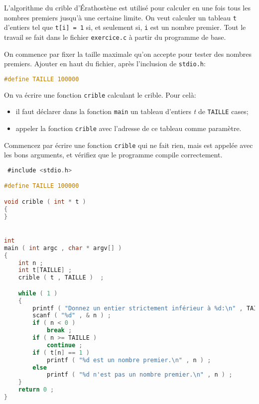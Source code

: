 \titre{\ttableaux}




\prerequis {}

L'algorithme du crible d'Érathostène est utilisé pour calculer en une
fois tous les nombres premiers jusqu'à une certaine limite. On veut
calculer un tableau \texttt{t} d'entiers tel que \texttt{t[i] = 1} si,
et seulement si, \texttt{i} est un nombre premier. Tout le travail se
fait dans le fichier \texttt{exercice.c} à partir
du programme de base.

\question On commence par fixer la taille maximale qu'on accepte pour
tester des nombres premiers. Ajouter en haut du fichier, après
l'inclusion de \texttt{stdio.h}:
\begin{lstlisting}[language=C]
#define TAILLE 100000
\end{lstlisting}

\question On va écrire une fonction \texttt{crible} calculant le crible. Pour celà:
\begin{itemize}
\item il faut déclarer dans la fonction \texttt{main} un tableau
  d'entiers \emph{t} de \texttt{TAILLE} cases;
\item appeler la fonction \texttt{crible} avec l'adresse de ce tableau
  comme paramètre.
\end{itemize}
Commencez par écrire une fonction \texttt{crible} qui ne fait rien,
mais est appelée avec les bons arguments, et vérifiez que le programme
compile correctement.

\begin{solution}
  \begin{lstlisting}[language=C]
 #include <stdio.h>

#define TAILLE 100000

void crible ( int * t )
{
}


int
main ( int argc , char * argv[] )
{
    int n ;
    int t[TAILLE] ;
    crible ( t , TAILLE )  ;

    while ( 1 )
    {
        printf ( "Donnez un entier strictement inférieur à %d:\n" , TAILLE ) ;
        scanf ( "%d" , & n ) ;
        if ( n < 0 )
            break ;
        if ( n >= TAILLE )
            continue ;
        if ( t[n] == 1 )
            printf ( "%d est un nombre premier.\n" , n ) ;
        else
            printf ( "%d n'est pas un nombre premier.\n" , n ) ;
    }
    return 0 ;
} 
  \end{lstlisting}
\end{solution}

